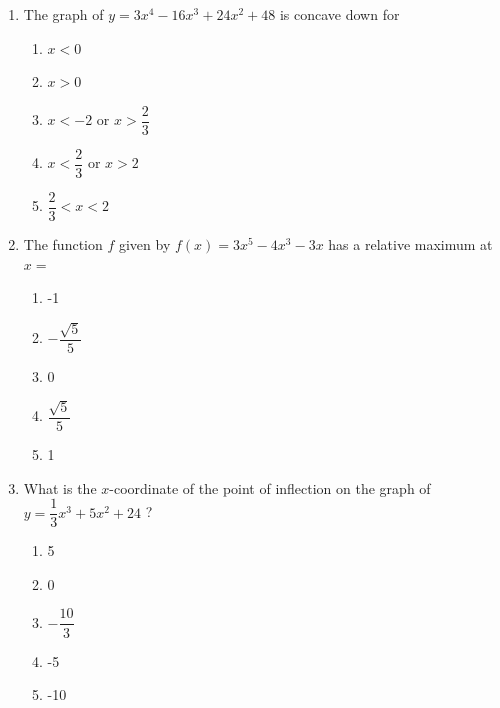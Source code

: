 \documentclass{article}
\begin{document}
\begin{enumerate}
\begin{minipage}[t]{\linewidth}
		\begin{enumerate}
		\itemsep1em
			\item \(x<-2\)
			\item \(-2<x<0\)
			\item \(x \succ 2\)
			\item \(x<0\)
			\item \(x>0\)
		\end{enumerate}
	\end{minipage}
	\item
	\begin{minipage}[t]{\linewidth}
		The graph of \(y=3 x^{4}-16 x^{3}+24 x^{2}+48\) is concave down for
\vspace{1em}
		\begin{enumerate}
		\itemsep1em
			\item \(x<0\)
			\item \(x>0\)
			\item \(x<-2\) or \(x>\dfrac{2}{3}\)
			\item \(x<\dfrac{2}{3}\) or \(x>2\)
			\item \(\dfrac{2}{3}<x<2\)
		\end{enumerate}
	\end{minipage}
	\item
	\begin{minipage}[t]{\linewidth}
		The function \(f\) given by \(f(x)=3 x^{5}-4 x^{3}-3 x\) has a relative
maximum at \(x=\)
\vspace{1em}
		\begin{enumerate}
		\itemsep1em
			\item -1
			\item \(-\dfrac{\sqrt{5}}{5}\)
			\item 0
			\item \(\dfrac{\sqrt{5}}{5}\)
			\item 1
		\end{enumerate}
	\end{minipage}
	\item
	\begin{minipage}[t]{\linewidth}
		What is the \(x\)-coordinate of the point of inflection on the graph of
\(y=\dfrac{1}{3} x^{3}+5 x^{2}+24\) ?
\vspace{1em}
		\begin{enumerate}
		\itemsep1em
			\item 5
			\item 0
			\item \(-\dfrac{10}{3}\)
			\item -5
			\item -10

\end{enumerate}
\end{minipage}
\end{enumerate}
\end{document}
